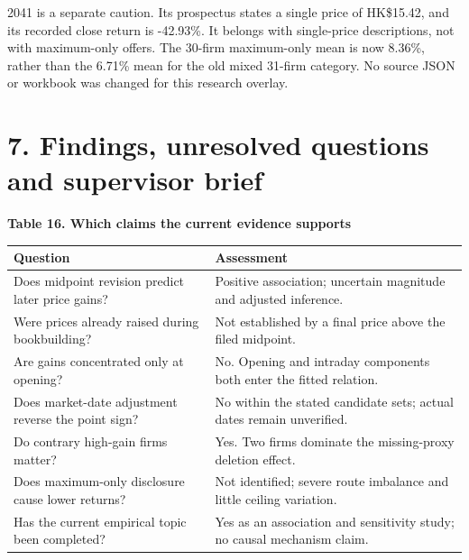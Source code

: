 \documentclass[10pt,a4paper]{article}
\begin{document}
2041 is a separate caution. Its prospectus states a single price of HK\$15.42, and its recorded close return is -42.93\%. It belongs with single-price descriptions, not with maximum-only offers. The 30-firm maximum-only mean is now 8.36\%, rather than the 6.71\% mean for the old mixed 31-firm category. No source JSON or workbook was changed for this research overlay.

\clearpage

\section*{7. Findings, unresolved questions and supervisor brief}

\par\addvspace{5pt}\textbf{Table 16. Which claims the current evidence supports}\par\nobreak\vspace{2pt}

{\small\renewcommand{\arraystretch}{1.10}\begin{tabularx}{\textwidth}{@{}p{}X@{}}\toprule

\textbf{Question} & \textbf{Assessment} \\\midrule

Does midpoint revision predict later price gains? & Positive association; uncertain magnitude and adjusted inference. \\

Were prices already raised during bookbuilding? & Not established by a final price above the filed midpoint. \\

Are gains concentrated only at opening? & No. Opening and intraday components both enter the fitted relation. \\

Does market-date adjustment reverse the point sign? & No within the stated candidate sets; actual dates remain unverified. \\

Do contrary high-gain firms matter? & Yes. Two firms dominate the missing-proxy deletion effect. \\

Does maximum-only disclosure cause lower returns? & Not identified; severe route imbalance and little ceiling variation. \\

Has the current empirical topic been completed? & Yes as an association and sensitivity study; no causal mechanism claim. \\

\bottomrule\end{tabularx}}\par
\end{document}
